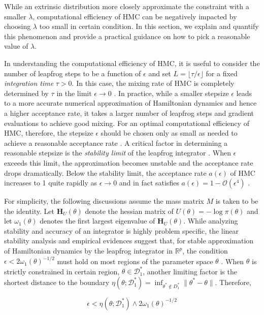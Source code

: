 \documentclass[10pt]{article}
\newcommand{\bb}[1]{\mathbb{#1}}
\newcommand{\mc}[1]{\mathcal{#1}}
\DeclareMathOperator{\1}{\mathbbm{1}}
\newcommand{\dt}{\epsilon} %
\newcommand{\mass}{M} %
\newcommand{\hess}{\mathbf{H}} %
\begin{document}
While an extrinsic distribution more closely approximate the constraint with a smaller $\lambda$, computational efficiency of HMC can be negatively impacted by choosing $\lambda$ too small in certain condition. In this section, we explain and quantify this phenomenon and provide a practical guidance on how to pick a reasonable value of $\lambda$.

In understanding the computational efficiency of HMC, it is useful to consider the number of leapfrog steps to be a function of $\dt$ and set $L = \lfloor \tau / \dt \rfloor$ for a fixed \textit{integration time} $\tau > 0$. In this case, the mixing rate of HMC is completely determined by $\tau$ in the limit $\dt \to 0$ \citep{betancourt17}. In practice, while a smaller stepsize $\dt$ leads to a more accurate numerical approximation of Hamiltonian dynamics and hence a higher acceptance rate, it takes a larger number of leapfrog steps and gradient evaluations to achieve good mixing. For an optimal computational efficiency of HMC, therefore, the stepsize $\dt$ should be chosen only as small as needed to achieve a reasonable acceptance rate \citep{beskos13, betancourt14}. A critical factor in determining a reasonable stepsize is the \textit{stability limit} of the leapfrog integrator \citep{neal2011mcmc}. When $\dt$ exceeds this limit, the approximation becomes unstable and the acceptance rate drops dramatically. Below the stability limit, the acceptance rate $a(\dt)$ of HMC increases to 1 quite rapidly as $\dt \to 0$ and in fact satisfies $a(\dt) = 1 - \mc O(\dt^4)$ \citep{beskos13}.

For simplicity, the following discussions assume the mass matrix $\mass$ is taken to be the identity. Let $\hess_U(\theta)$ denote the hessian matrix of $U(\theta) = - \log \pi(\theta)$ and let $\omega_1(\theta)$ denotes the first largest eigenvalue of $\hess_U(\theta)$. While analyzing stability and accuracy of an integrator is highly problem specific, the linear stability analysis and empirical evidences suggest that, for stable approximation of Hamiltonian dynamics by the leapfrog integrator in $\bb R^p$, the condition $\dt < 2\omega_1(\theta)^{-1/2}$ must hold on most regions of the parameter space $\theta$ \citep{hairer06}.
When $\theta$ is strictly constrained in certain region, $\theta\in \mc D^*_1$, another limiting factor is the shortest distance to the boundary $\eta (\theta; {\mc D^*_1})= \inf_{\theta^*\not\in D_1^*}\|\theta^*-\theta\|$. Therefore,

\begin{equation}
\label{stabilityCondition}
\dt <  \eta (\theta; {\mc D^*_1}) \wedge 2\omega_1(\theta)^{-1/2} 
\end{equation}
\end{document}
